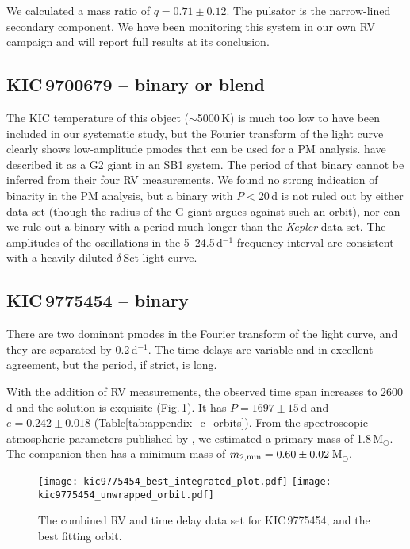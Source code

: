 \documentclass[a4paper,fleqn,usenatbib]{mnras}
\begin{document}
We calculated a mass ratio of $q=0.71\pm0.12$. The pulsator is the narrow-lined secondary component. We have been monitoring this system in our own RV campaign and will report full results at its conclusion.


\subsection{KIC\,9700679 -- binary or blend}
The KIC temperature of this object ($\sim$5000\,K) is much too low to have been included in our systematic study, but the Fourier transform of the light curve clearly shows low-amplitude p\:modes that can be used for a PM analysis. \citeauthor{lampensetal2017} have described it as a G2 giant in an SB1 system. The period of that binary cannot be inferred from their four RV measurements. We found no strong indication of binarity in the PM analysis, but a binary with $P < 20$\,d is not ruled out by either data set (though the radius of the G giant argues against such an orbit), nor can we rule out a binary with a period much longer than the \textit{Kepler} data set. The amplitudes of the oscillations in the 5--24.5\,d$^{-1}$ frequency interval are consistent with a heavily diluted $\delta$\,Sct light curve.


\subsection{KIC\,9775454 -- binary}
There are two dominant p\:modes in the Fourier transform of the light curve, and they are separated by 0.2\,d$^{-1}$. The time delays are variable and in excellent agreement, but the period, if strict, is long.

With the addition of RV measurements, the observed time span increases to 2600\,d and the solution is exquisite (Fig.\,\ref{fig:9775454}). It has $P = 1697\pm15$\,d and $e=0.242\pm0.018$ (Table\:\ref{tab:appendix_c_orbits}). From the spectroscopic atmospheric parameters published by \citeauthor{lampensetal2017}, we estimated a primary mass of 1.8\,M$_{\odot}$. The companion then has a minimum mass of $m_{\rm 2,min} = 0.60\pm0.02$\,M$_{\odot}$.

\begin{figure}
\begin{center}
\texttt{[image: kic9775454\_best\_integrated\_plot.pdf]}
\texttt{[image: kic9775454\_unwrapped\_orbit.pdf]}
\caption{The combined RV and time delay data set for KIC\,9775454, and the best fitting orbit.}
\label{fig:9775454}
\end{center}
\end{figure}
\end{document}
